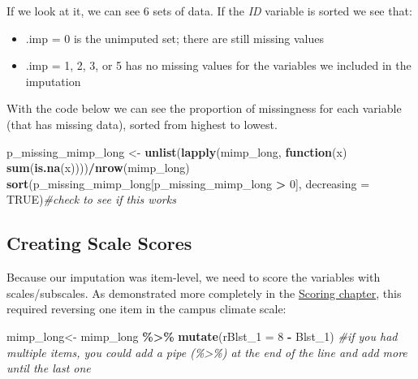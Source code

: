 \documentclass[
  11pt,
]{book}
\newenvironment{Shaded}{\begin{snugshade}}{\end{snugshade}}
\newcommand{\AttributeTok}[1]{\textcolor[rgb]{0.27,0.27,0.27}{#1}}
\newcommand{\CommentTok}[1]{\textcolor[rgb]{0.37,0.37,0.37}{\textit{#1}}}
\newcommand{\ConstantTok}[1]{\textcolor[rgb]{0.37,0.37,0.37}{#1}}
\newcommand{\ControlFlowTok}[1]{\textcolor[rgb]{0.27,0.27,0.27}{\textbf{#1}}}
\newcommand{\DecValTok}[1]{\textcolor[rgb]{0.06,0.06,0.06}{#1}}
\newcommand{\FunctionTok}[1]{\textcolor[rgb]{0.27,0.27,0.27}{\textbf{#1}}}
\newcommand{\NormalTok}[1]{#1}
\newcommand{\OtherTok}[1]{\textcolor[rgb]{0.37,0.37,0.37}{#1}}
\newcommand{\SpecialCharTok}[1]{\textcolor[rgb]{0.43,0.43,0.43}{\textbf{#1}}}
\providecommand{\tightlist}{%
  \setlength{\itemsep}{0pt}\setlength{\parskip}{0pt}}
\begin{document}
If we look at it, we can see 6 sets of data. If the \emph{ID} variable is sorted we see that:

\begin{itemize}
\tightlist
\item
  .imp = 0 is the unimputed set; there are still missing values
\item
  .imp = 1, 2, 3, or 5 has no missing values for the variables we included in the imputation
\end{itemize}

With the code below we can see the proportion of missingness for each variable (that has missing data), sorted from highest to lowest.

\begin{Shaded}
\begin{Highlighting}[]
\NormalTok{p\_missing\_mimp\_long }\OtherTok{\textless{}{-}} \FunctionTok{unlist}\NormalTok{(}\FunctionTok{lapply}\NormalTok{(mimp\_long, }\ControlFlowTok{function}\NormalTok{(x) }\FunctionTok{sum}\NormalTok{(}\FunctionTok{is.na}\NormalTok{(x))))}\SpecialCharTok{/}\FunctionTok{nrow}\NormalTok{(mimp\_long)}
\FunctionTok{sort}\NormalTok{(p\_missing\_mimp\_long[p\_missing\_mimp\_long }\SpecialCharTok{\textgreater{}} \DecValTok{0}\NormalTok{], }\AttributeTok{decreasing =} \ConstantTok{TRUE}\NormalTok{)}\CommentTok{\#check to see if this works}
\end{Highlighting}
\end{Shaded}

\hypertarget{creating-scale-scores}{%
\subsection{Creating Scale Scores}\label{creating-scale-scores}}

Because our imputation was item-level, we need to score the variables with scales/subscales. As demonstrated more completely in the \protect\hyperlink{score}{Scoring chapter}, this required reversing one item in the campus climate scale:

\begin{Shaded}
\begin{Highlighting}[]
\NormalTok{mimp\_long}\OtherTok{\textless{}{-}}\NormalTok{ mimp\_long }\SpecialCharTok{\%\textgreater{}\%}
  \FunctionTok{mutate}\NormalTok{(}\AttributeTok{rBlst\_1 =} \DecValTok{8} \SpecialCharTok{{-}}\NormalTok{ Blst\_1) }\CommentTok{\#if you had multiple items, you could add a pipe (\%\textgreater{}\%) at the end of the line and add more until the last one}
\end{Highlighting}
\end{Shaded}
\end{document}
